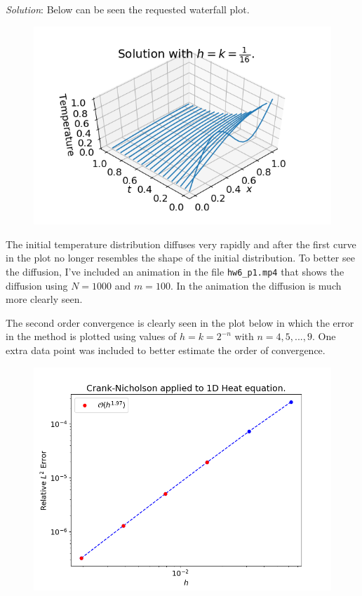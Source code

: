 \documentclass[final,oneside,onecolumn]{article}
\begin{document}
\begin{enumerate}
\textit{Solution}: Below can be seen the requested waterfall plot.
\begin{figure}[H]
    \centering
    \includegraphics[width=.8\linewidth]{hw6_p1b_waterfall}
\end{figure}
The initial temperature distribution diffuses very rapidly and after the first curve in the plot no longer resembles the shape of the initial distribution. To better see the diffusion, I've included an animation in the file \texttt{hw6\_p1.mp4} that shows the diffusion using $N=1000$ and $m=100$. In the animation the diffusion is much more clearly seen.
\bigbreak

The second order convergence is clearly seen in the plot below in which the error in the method is plotted using values of $h=k = 2^{-n}$ with $n= 4,5,..., 9$. One extra data point was included to better estimate the order of convergence.
\begin{figure}[H]
    \centering
    \includegraphics[width=.8\linewidth]{hw6_p1b_convergence}
\end{figure}


\end{enumerate}
\end{document}
